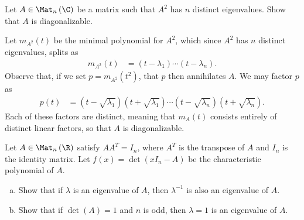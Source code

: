 \documentclass[10pt]{mypackage}
\begin{document}
\begin{problem}[Problem 8]
  Let $A\in \Mat_{n}\left( \C \right)$ be a matrix such that $A^2$ has $n$ distinct eigenvalues. Show that $A$ is diagonalizable.
\end{problem}
\begin{solution}
  Let $m_{A^2}(t)$ be the minimal polynomial for $A^2$, which since $A^2$ has $n$ distinct eigenvalues, splits as
  \begin{align*}
    m_{A^2}(t) &= \left( t-\lambda_1 \right) \cdots \left( t-\lambda_n  \right).
  \end{align*}
  Observe that, if we set $p = m_{A^2}\left( t^2 \right)$, that $p$ then annihilates $A$. We may factor $p$ as
  \begin{align*}
    p(t) &= \left( t-\sqrt{\lambda_1} \right)\left( t + \sqrt{\lambda_1} \right) \cdots \left( t-\sqrt{\lambda_n} \right)\left( t + \sqrt{\lambda_n} \right).
  \end{align*}
  Each of these factors are distinct, meaning that $m_A(t)$ consists entirely of distinct linear factors, so that $A$ is diagonalizable.
\end{solution}
\begin{problem}
  Let $A\in \Mat_{n}\left( \R \right)$ satisfy $AA^{T} = I_n$, where $A^T$ is the transpose of $A$ and $I_n$ is the identity matrix. Let $f(x) = \det\left( xI_n - A \right)$ be the characteristic polynomial of $A$.
  \begin{enumerate}[(a)]
    \item Show that if $\lambda$ is an eigenvalue of $A$, then $\lambda^{-1}$ is also an eigenvalue of $A$.
    \item Show that if $ \det\left( A \right) = 1$ and $n$ is odd, then $\lambda = 1$ is an eigenvalue of $A$.
  \end{enumerate}
\end{problem}
\end{document}
